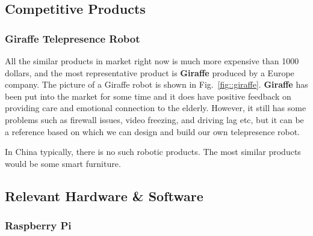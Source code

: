 \documentclass[12pt]{article}
\begin{document}
\subsection{Competitive Products}
\subsubsection{Giraffe Telepresence Robot}
All the similar products in market right now is much more expensive than 1000 dollars, and the most representative product is \textbf{Giraffe} produced by a Europe company. The picture of a Giraffe robot is shown in Fig.~\ref{fig::giraffe}.
\textbf{Giraffe} has been put into the market for some time and it does have positive feedback on providing care and emotional connection to the elderly. However, it still has some problems such as firewall issues, video freezing, and driving lag etc, but it can be a reference based on which we can design and build our own telepresence robot.
\par In China typically, there is no such robotic products. The most similar products would be some smart furniture.
\subsection{Relevant Hardware \& Software}
\subsubsection{Raspberry Pi}
\end{document}
